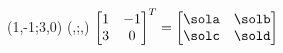 \TRANSPOSEMATRIX(1,-1;3,0)%
          (\sola,\solb;\solc,\sold)
$\begin{bmatrix}
       1 & -1 \\ 3 & 0
     \end{bmatrix}^T=\begin{bmatrix}
       \sola & \solb \\ \solc & \sold
     \end{bmatrix}$
